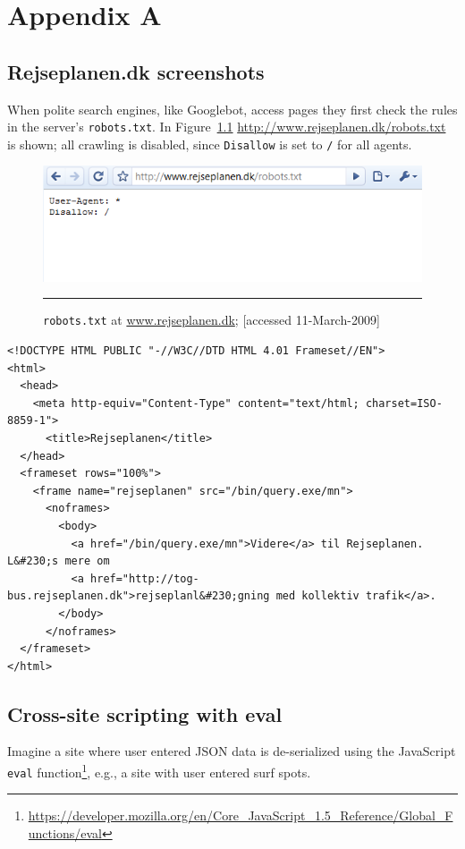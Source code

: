 
\chapter{Appendix A}
\label{AppendixA}

\section{Rejseplanen.dk screenshots}
When polite search engines, like Googlebot, access pages they first check the
rules in the server's \verb|robots.txt|. In
Figure~\ref{app:fig:rejseplanen_robots} \url{http://www.rejseplanen.dk/robots.txt} is shown;
all crawling is disabled, since \verb|Disallow| is set to \verb|/| for all agents.

\begin{figure}[htbp]
  \centering
  \includegraphics[width=14cm]{./Figures/rejseplanen_robots_110309}
  \rule{\textwidth}{0.005in}
  \caption{{\tt robots.txt} at \url{www.rejseplanen.dk}; [accessed 11-March-2009]}
  \label{app:fig:rejseplanen_robots}
\end{figure}

\begin{lstlisting}[caption=\url{http://www.rejseplanen.dk/},label=lst:rejseplanen.dk]
<!DOCTYPE HTML PUBLIC "-//W3C//DTD HTML 4.01 Frameset//EN">
<html>
  <head>
    <meta http-equiv="Content-Type" content="text/html; charset=ISO-8859-1">
      <title>Rejseplanen</title>
  </head>
  <frameset rows="100%">
    <frame name="rejseplanen" src="/bin/query.exe/mn">
      <noframes>
        <body>
          <a href="/bin/query.exe/mn">Videre</a> til Rejseplanen. L&#230;s mere om
          <a href="http://tog-bus.rejseplanen.dk">rejseplanl&#230;gning med kollektiv trafik</a>.
        </body>
      </noframes>
  </frameset>
</html>
\end{lstlisting}

\section{Cross-site scripting with eval}\label{sec:xss}
Imagine a site where user entered JSON data is de-serialized using the JavaScript
\verb|eval|
function\footnote{\url{https://developer.mozilla.org/en/Core_JavaScript_1.5_Reference/Global_Functions/eval}},
e.g., a site with user entered surf spots. 

